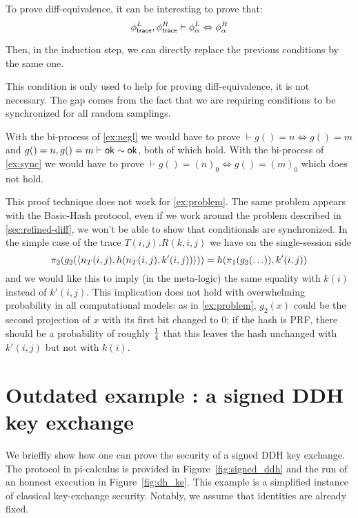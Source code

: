 To prove diff-equivalence, it can be interesting to prove that:
$$ \phi^L_{\textsf{trace}}, \phi^R_{\textsf{trace}} \vdash \phi^L_\alpha \Leftrightarrow \phi^R_\alpha $$

Then, in the induction step, we can directly replace the previous conditions by the same one.


This condition is only used to help for proving diff-equivalence, it is not necessary.
The gap comes from the fact that we are requiring conditions to be
synchronized for all random samplings.

\begin{example}
  With the bi-process of \cref{ex:negl} we would have to prove
  $\vdash g() = n \Leftrightarrow g() = m$ and
  $g()=n, g()=m \vdash \mathsf{ok} \sim \mathsf{ok}$, both of which hold.
  With the bi-process of \cref{ex:sync} we would have to prove
  $\vdash g() = (n)_0 \Leftrightarrow g() = (m)_0$ which does not hold.
\end{example}

\begin{example} \label{ex:indep}
  This proof technique does not work for \cref{ex:problem}.
  The same problem appears with the Basic-Hash protocol, even if we work around
the problem described in \cref{sec:refined-diff}, we won't be able to show
that conditionals are synchronized.  In the simple case of the trace
$T(i,j).R(k,i,j)$ we have
on the single-session side
$$\pi_2(g_2(\langle n_T(i,j),h(n_T(i,j),k'(i,j)) \rangle)) =
 h(\pi_1(g_2(\ldots)),k'(i,j))$$
and we would like this to imply (in the meta-logic)
the same equality with $k(i)$ instead of $k'(i,j)$.
This implication does not hold with overwhelming probability in all
computational models: as in \cref{ex:problem}, $g_2(x)$ could be the second
projection of $x$ with its first bit changed to $0$; if the hash is PRF,
there should be a probability of roughly $1 \over 4$ that this leaves
the hash unchanged with $k'(i,j)$ but not with $k(i)$.
\end{example}

\section{Outdated example : a signed DDH key exchange}

We brieffly show how one can prove the security of a signed DDH key exchange. The protocol in pi-calculus is provided in Figure~\ref{fig:signed_ddh} and the run of an honnest execution in Figure~\ref{fig:dh_ke}. This example is a simplified instance of classical key-exchange security. Notably, we assume that identities are already fixed.

